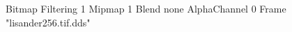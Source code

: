 {Bitmap
	{Filtering 1}
	{Mipmap 1}
	{Blend none}
	{AlphaChannel 0}
	{Frame "lisander256.tif.dds"}
}
